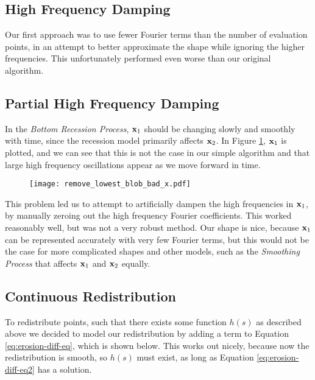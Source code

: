 \subsection*{High Frequency Damping}

Our first approach was to use fewer Fourier terms than the number of evaluation points, in an attempt to better approximate the shape while ignoring the higher frequencies. This unfortunately performed even worse than our original algorithm.

\subsection*{Partial High Frequency Damping}

In the \textit{Bottom Recession Process}, $\mathbf{x}_1$ should be changing slowly and smoothly with time, since the recession model primarily affects $\mathbf{x}_2$. In Figure \ref{fig:remove-lowest-blob-bad-x}, $\mathbf{x}_1$ is plotted, and we can see that this is not the case in our simple algorithm and that large high frequency oscillations appear as we move forward in time. 

\begin{figure}[H]
    \begin{center}
      \texttt{[image: remove\_lowest\_blob\_bad\_x.pdf]}
    \end{center}
  \vspace{-.2in} %
  \caption{\label{fig:remove-lowest-blob-bad-x}}
\end{figure}

This problem led us to attempt to artificially dampen the high frequencies in $\mathbf{x}_1$, by manually zeroing out the high frequency Fourier coefficients. This worked reasonably well, but was not a very robust method. Our shape is nice, because $\mathbf{x}_1$ can be represented accurately with very few Fourier terms, but this would not be the case for more complicated shapes and other models, such as the \textit{Smoothing Process} that affects $\mathbf{x}_1$ and $\mathbf{x}_2$ equally. 

\subsection*{Continuous Redistribution}

To redistribute points, such that there exists some function $h(s)$ as described above we decided to model our redistribution by adding a term to Equation \ref{eq:erosion-diff-eq}, which is shown below. This works out nicely, because now the redistribution is smooth, so $h(s)$ must exist, as long as Equation \ref{eq:erosion-diff-eq2} has a solution.

